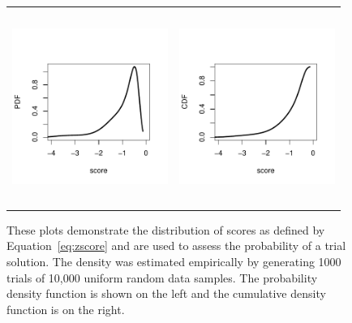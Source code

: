 \begin{figure}[!htb]
\centering
\begin{tabular}{p{} p{}}
  \vspace{0pt} \includegraphics[width=2.0in, height=2.5in]{Figure1a.pdf} &
  \vspace{0pt} \includegraphics[width=2.0in, height=2.5in]{Figure1b.pdf} 
\end{tabular}
\caption{\label{fig:scores} These plots demonstrate the distribution of scores as defined by Equation~\ref{eq:zscore} and are used to assess the probability of a trial solution. The density was estimated empirically by generating 1000 trials of 10,000 uniform random data samples. The probability density function is shown on the left and the cumulative density function is on the right. }
\end{figure}

